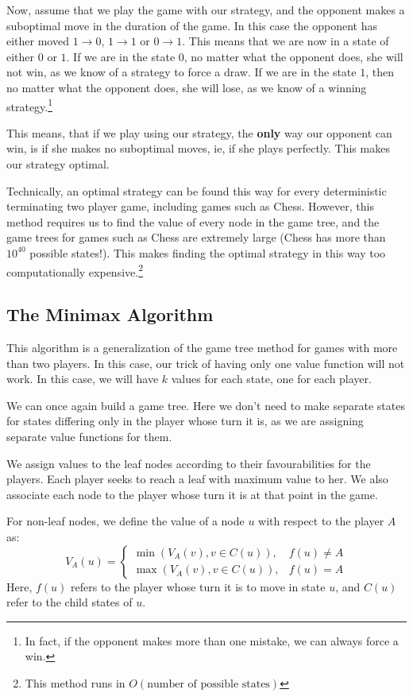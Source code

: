 \documentclass[12pt]{report}
\begin{document}
Now, assume that we play the game with our strategy, and the opponent makes a suboptimal move in the duration of the game. In this case the opponent has either 
moved $1 \rightarrow 0$, $1 \rightarrow 1$ or $0 \rightarrow 1$. This means that we are now in a state of either $0$ or $1$. If we are in the state $0$, no matter what the opponent does, she will
not win, as we know of a strategy to force a draw. If we are in the state $1$, then no matter what the opponent does, she will lose, as we know of a winning strategy.\footnote{In fact, if the opponent makes more than one mistake, we can always force a win.}

This means, that if we play using our strategy, the \textbf{only} way our opponent can win, is if she makes no suboptimal moves, ie, if she plays perfectly. This makes our strategy optimal.

Technically, an optimal strategy can be found this way for every deterministic terminating two player game, including games such as Chess. However, this method requires us to find the value of every node in the game tree, and the game trees 
for games such as Chess are extremely large (Chess has more than $10^{40}$ possible states!). This makes finding the optimal strategy in this way too computationally expensive.\footnote{This method runs in $O(\text{number of possible states})$}
\subsection{The Minimax Algorithm}
This algorithm is a generalization of the game tree method for games with more than two players. In this case, our trick of having only one value function will not work.
In this case, we will have $k$ values for each state, one for each player.

We can once again build a game tree. Here we don't need to make separate states for states differing only in the player whose turn it is, as we are assigning separate value functions for them.

We assign values to the leaf nodes according to their favourabilities for the players. Each player seeks to reach a leaf with maximum value to her. We also associate each node to the player whose turn it is at that point in the game.

For non-leaf nodes, we define the value of a node $u$ with respect to the player $A$ as:
\begin{equation}
    V_{A}(u) = \begin{cases}
        \min(V_{A}(v),  v \in C(u)), & f(u) \neq A\\
        \max(V_{A}(v), v \in C(u)), & f(u) = A
    \end{cases}
\end{equation}
Here, $f(u)$ refers to the player whose turn it is to move in state $u$, and $C(u)$ refer to the child states of $u$.
\end{document}
